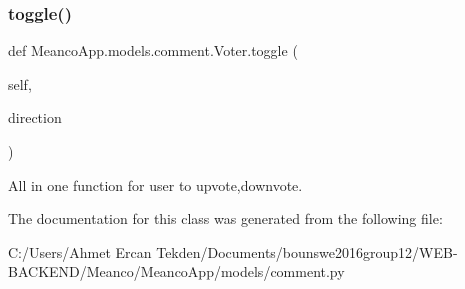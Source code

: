 \subsubsection{\texorpdfstring{toggle()}{toggle()}}
{\footnotesize\ttfamily def Meanco\+App.\+models.\+comment.\+Voter.\+toggle (\begin{DoxyParamCaption}\item[{}]{self,  }\item[{}]{direction }\end{DoxyParamCaption})}



All in one function for user to upvote,downvote. 



The documentation for this class was generated from the following file\+:\begin{DoxyCompactItemize}
\item 
C\+:/\+Users/\+Ahmet Ercan Tekden/\+Documents/bounswe2016group12/\+W\+E\+B-\/\+B\+A\+C\+K\+E\+N\+D/\+Meanco/\+Meanco\+App/models/comment.\+py\end{DoxyCompactItemize}
